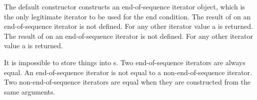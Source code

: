 \pnum
{}%
The default constructor constructs
an end-of-sequence iterator object, which is the only legitimate
iterator to be used for the end condition. The result of  on
an end-of-sequence iterator is not defined. For any other iterator value a
 is returned.
The result of  on an end-of-sequence iterator
is not defined. For any other iterator value a  is returned.

\pnum
{}%
%
It is impossible to store things
into s. Two end-of-sequence iterators are always
equal. An end-of-sequence iterator is not equal to a
non-end-of-sequence iterator. Two non-end-of-sequence iterators are
equal when they are constructed from the same arguments.

